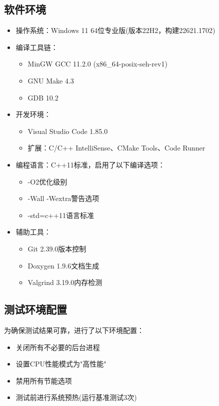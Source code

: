 \documentclass[12pt,a4paper]{article}
\begin{document}
\subsection{软件环境}
\begin{itemize}
\item 操作系统：Windows 11 64位专业版(版本22H2，构建22621.1702)
\item 编译工具链：
  \begin{itemize}
  \item MinGW GCC 11.2.0 (x86\_64-posix-seh-rev1)
  \item GNU Make 4.3
  \item GDB 10.2
  \end{itemize}
\item 开发环境：
  \begin{itemize}
  \item Visual Studio Code 1.85.0
  \item 扩展：C/C++ IntelliSense、CMake Tools、Code Runner
  \end{itemize}
\item 编程语言：C++11标准，启用了以下编译选项：
  \begin{itemize}
  \item -O2优化级别
  \item -Wall -Wextra警告选项
  \item -std=c++11语言标准
  \end{itemize}
\item 辅助工具：
  \begin{itemize}
  \item Git 2.39.0版本控制
  \item Doxygen 1.9.6文档生成
  \item Valgrind 3.19.0内存检测
  \end{itemize}
\end{itemize}

\subsection{测试环境配置}
为确保测试结果可靠，进行了以下环境配置：
\begin{itemize}
\item 关闭所有不必要的后台进程
\item 设置CPU性能模式为"高性能"
\item 禁用所有节能选项
\item 测试前进行系统预热(运行基准测试3次)
\end{itemize}
\end{document}
